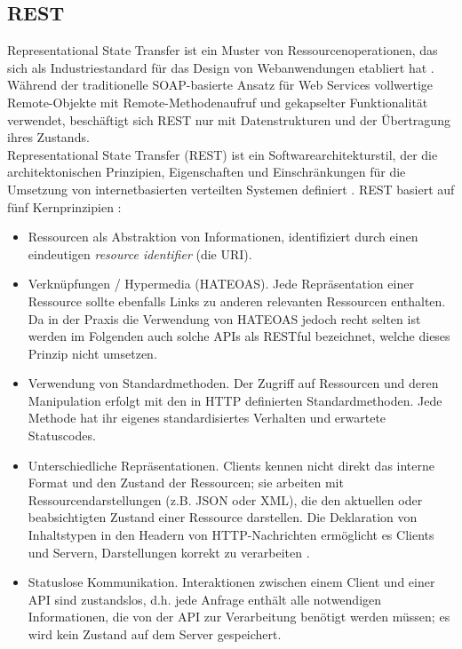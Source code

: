 \subsection{REST}

Representational State Transfer ist ein Muster von Ressourcenoperationen, das sich als Industriestandard für das Design von Webanwendungen etabliert hat \parencite[2]{battle2008bridging}. Während der traditionelle SOAP-basierte Ansatz für Web Services vollwertige Remote-Objekte mit Remote-Methodenaufruf und gekapselter Funktionalität verwendet, beschäftigt sich REST nur mit Datenstrukturen und der Übertragung ihres Zustands. \\

Representational State Transfer (REST) ist ein Softwarearchitekturstil, der die architektonischen Prinzipien, Eigenschaften und Einschränkungen für die Umsetzung von internetbasierten verteilten Systemen definiert \parencite[86]{fielding2000architectural}. REST basiert auf fünf Kernprinzipien \parencite[11]{tilkov2015rest}:

\begin{itemize}
	\item Ressourcen als Abstraktion von Informationen, identifiziert durch einen eindeutigen \emph{resource identifier} (die URI).
	\item Verknüpfungen / Hypermedia (HATEOAS). Jede Repräsentation einer Ressource sollte ebenfalls Links zu anderen relevanten Ressourcen enthalten. Da in der Praxis die Verwendung von HATEOAS jedoch recht selten ist \parencite[35--36]{rodriguez2016rest} werden im Folgenden auch solche APIs als RESTful bezeichnet, welche dieses Prinzip nicht umsetzen.
	\item Verwendung von Standardmethoden. Der Zugriff auf Ressourcen und deren Manipulation erfolgt mit den in HTTP definierten Standardmethoden. Jede Methode hat ihr eigenes standardisiertes Verhalten und erwartete Statuscodes.
	\item Unterschiedliche Repräsentationen. Clients kennen nicht direkt das interne Format und den Zustand der Ressourcen; sie arbeiten mit Ressourcendarstellungen (z.B. JSON oder XML), die den aktuellen oder beabsichtigten Zustand einer Ressource darstellen. Die Deklaration von Inhaltstypen in den Headern von HTTP-Nachrichten ermöglicht es Clients und Servern, Darstellungen korrekt zu verarbeiten \parencite[23]{rodriguez2016rest}.
	\item Statuslose Kommunikation. Interaktionen zwischen einem Client und einer API sind zustandslos, d.h. jede Anfrage enthält alle notwendigen Informationen, die von der API zur Verarbeitung benötigt werden müssen; es wird kein Zustand auf dem Server gespeichert.
\end{itemize}

